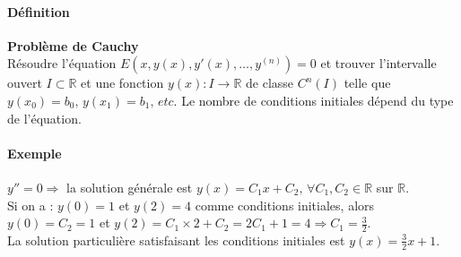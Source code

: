 \documentclass[1Opt]{report}
\begin{document}
\paragraph{Définition}
\textbf{Problème de Cauchy}\\
Résoudre l'équation $E\left(x,y(x),y'(x),\ldots,y^{(n)}\right)=0$ et trouver
l'intervalle ouvert $I\subset{\mathbb R}$ et une fonction
$y(x):I\rightarrow{\mathbb R}$ de classe $C^n(I)$ telle que
$y(x_0)=b_0,\,y(x_1)=b_1,\, etc$. Le nombre de conditions initiales dépend du
type de l'équation.

\paragraph{Exemple}
$y''=0\Rightarrow$ la solution générale est
$y(x)=C_1x+C_2,\,\forall C_1,C_2\in{\mathbb R}$ sur ${\mathbb R}$. \\
Si on a : $y(0)=1$ et $y(2)=4$ comme conditions initiales, alors $y(0)=C_2=1$ et
$y(2)=C_1\times 2+C_2=2C_1+1=4\Rightarrow C_1=\frac{3}{2}$.\\
La solution particulière satisfaisant les conditions initiales est $y(x)=
\frac{3}{2}x+1$.
\end{document}
